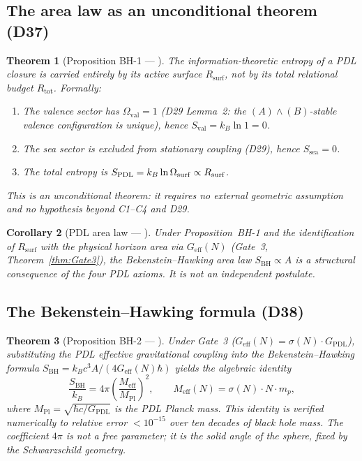 \documentclass[11pt,a4paper]{article}
\theoremstyle{plain}
\newtheorem{theorem}{Theorem}[section]
\newtheorem{corollary}[theorem]{Corollary}
\theoremstyle{definition}
\theoremstyle{remark}
\newcommand{\PDL}{\textnormal{PDL}}
\newcommand{\Geff}{G_{\mathrm{eff}}}
\newcommand{\GPDL}{G_{\mathrm{PDL}}}
\newcommand{\Rsurf}{R_{\mathrm{surf}}}
\newcommand{\Rtot}{R_{\mathrm{tot}}}
\newcommand{\sigmaN}{\sigma(N)}
\newcommand{\SBH}{S_{\mathrm{BH}}}
\newcommand{\Meff}{M_{\mathrm{eff}}}
\newcommand{\MPl}{M_{\mathrm{Pl}}}
\begin{document}
\subsection{The area law as an unconditional theorem (D37)}
\label{subsec:bh_area}

\begin{theorem}[Proposition BH-1 — \citep{D37}]
\label{thm:BH1}
The information-theoretic entropy of a PDL closure is carried entirely by its active surface $\Rsurf$, not by its total relational budget $\Rtot$.
Formally:
\begin{enumerate}
\item The valence sector has $\Omega_{\mathrm{val}} = 1$ (D29 Lemma~2: the $(A)\wedge(B)$-stable valence configuration is unique), hence $S_{\mathrm{val}} = k_B \ln 1 = 0$.
\item The sea sector is excluded from stationary coupling (D29), hence $S_{\mathrm{sea}} = 0$.
\item The total entropy is $S_{\PDL} = k_B \ln \Omega_{\mathrm{surf}} \propto \Rsurf$.
\end{enumerate}
This is an \emph{unconditional theorem}: it requires no external geometric assumption and no hypothesis beyond C1--C4 and D29.
\end{theorem}

\begin{corollary}[PDL area law — \citep{D37}]
\label{cor:area_law}
Under Proposition~BH-1 and the identification of $\Rsurf$ with the physical horizon area via $\Geff(N)$ (Gate~3, Theorem~\ref{thm:Gate3}), the Bekenstein--Hawking area law $\SBH \propto A$ is a structural consequence of the four PDL axioms.
It is not an independent postulate.
\end{corollary}

\subsection{The Bekenstein--Hawking formula (D38)}
\label{subsec:bh_formula}

\begin{theorem}[Proposition BH-2 — \citep{D38}]
\label{thm:BH2}
Under Gate~3 ($\Geff(N)=\sigmaN\cdot\GPDL$), substituting the PDL effective gravitational coupling into the Bekenstein--Hawking formula $\SBH = k_B c^3 A/(4\Geff(N)\hbar)$ yields the algebraic identity
\[
\frac{\SBH}{k_B} = 4\pi\left(\frac{\Meff}{\MPl}\right)^2,
\qquad
\Meff(N) = \sigma(N)\cdot N\cdot m_p,
\]
where $\MPl = \sqrt{\hbar c/\GPDL}$ is the PDL Planck mass.
This identity is verified numerically to relative error $<10^{-15}$ over ten decades of black hole mass.
The coefficient $4\pi$ is not a free parameter; it is the solid angle of the sphere, fixed by the Schwarzschild geometry.
\end{theorem}
\end{document}
